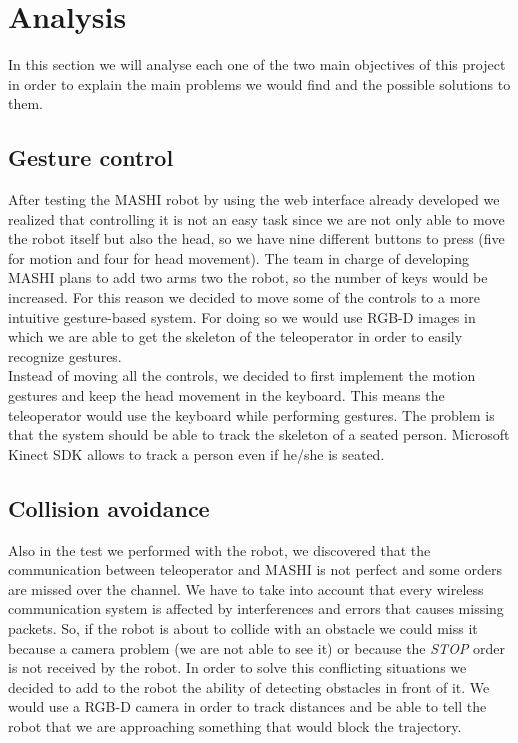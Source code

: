 \section{Analysis}
\label{sec:analysis}

In this section we will analyse each one of the two main objectives of this project in order to explain the main problems we would find and the possible solutions to them.

\subsection{Gesture control}

After testing the MASHI robot by using the web interface already developed we realized that controlling it is not an easy task since we are not only able to move the robot itself but also the head, so we have nine different buttons to press (five for motion and four for head movement). The team in charge of developing MASHI plans to add two arms two the robot, so the number of keys would be increased.
For this reason we decided to move some of the controls to a more intuitive gesture-based system. For doing so we would use RGB-D images in which we are able to get the skeleton of the teleoperator in order to easily recognize gestures.\\

Instead of moving all the controls, we decided to first implement the motion gestures and keep the head movement in the keyboard. This means the teleoperator would use the keyboard while performing gestures. The problem is that the system should be able to track the skeleton of a seated person. Microsoft Kinect SDK allows to track a person even if he/she is seated.\\


\subsection{Collision avoidance}

Also in the test we performed with the robot, we discovered that the communication between teleoperator and MASHI is not perfect and some orders are missed over the channel. We have to take into account that every wireless communication system is affected by interferences and errors that causes missing packets. So, if the robot is about to collide with an obstacle we could miss it because a camera problem (we are not able to see it) or because the \textit{STOP} order is not received by the robot. In order to solve this conflicting situations we decided to add to the robot the ability of detecting obstacles in front of it. We would use a RGB-D camera in order to track distances and be able to tell the robot that we are approaching something that would block the trajectory.